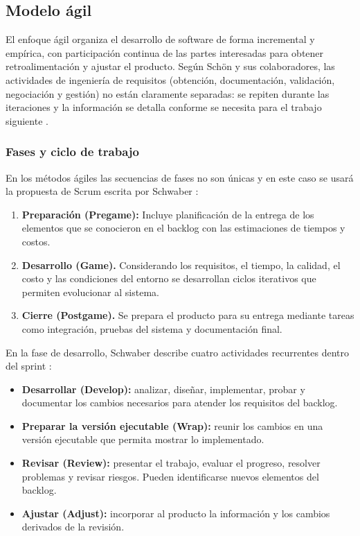 \subsection{Modelo ágil}

El enfoque ágil organiza el desarrollo de software de forma incremental y empírica, con participación continua de las partes interesadas para obtener retroalimentación y ajustar el producto. Según Schön y sus colaboradores, las actividades de ingeniería de requisitos (obtención, documentación, validación, negociación y gestión) no están claramente separadas: se repiten durante las iteraciones y la información se detalla conforme se necesita para el trabajo siguiente \cite{schon2017}.

\subsubsection{Fases y ciclo de trabajo}

En los métodos ágiles las secuencias de fases no son únicas y en este caso se usará la propuesta de Scrum escrita por Schwaber \cite{schwaber1997}:

\begin{enumerate}
	\item \textbf{Preparación (Pregame):} Incluye planificación de la entrega de los elementos que se conocieron en el backlog con las estimaciones de tiempos y costos.
	
	\item \textbf{Desarrollo (Game).} Considerando los requisitos, el tiempo, la calidad, el costo y las condiciones del entorno se desarrollan ciclos iterativos que permiten evolucionar al sistema.
	
	\item \textbf{Cierre (Postgame).} Se prepara el producto para su entrega mediante tareas como integración, pruebas del sistema y documentación final.
\end{enumerate}

En la fase de desarrollo, Schwaber describe cuatro actividades recurrentes dentro del sprint \cite{schwaber1997}:

\begin{itemize}
	\item \textbf{Desarrollar (Develop):} analizar, diseñar, implementar, probar y documentar los cambios necesarios para atender los requisitos del backlog.
	
	\item \textbf{Preparar la versión ejecutable (Wrap):} reunir los cambios en una versión ejecutable que permita mostrar lo implementado.
	
	\item \textbf{Revisar (Review):} presentar el trabajo, evaluar el progreso, resolver problemas y revisar riesgos. Pueden identificarse nuevos elementos del backlog.
	
	\item \textbf{Ajustar (Adjust):} incorporar al producto la información y los cambios derivados de la revisión.
\end{itemize}

